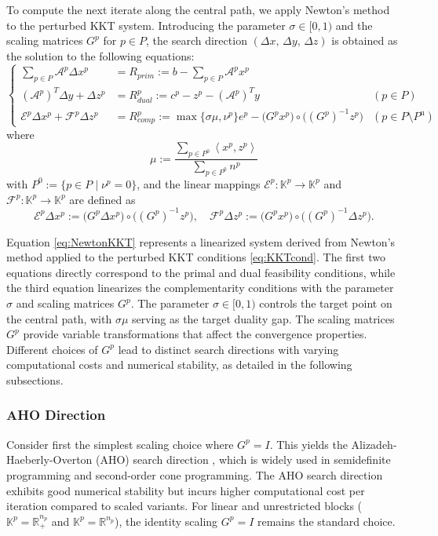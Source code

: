 To compute the next iterate along the central path, we apply Newton's method to the perturbed KKT system. 
Introducing the parameter $\sigma \in [0,1)$ and the scaling matrices $G^p$ for $p \in P$, the search direction $(\Delta x,\, \Delta y,\, \Delta z)$ is obtained as the solution to the following equations:
\begin{equation}
    \renewcommand{\arraystretch}{2.5}
    \left\{
    \begin{array}{rll}
         \sum_{p \in P} \mathcal{A}^p \Delta x^p & = R_{prim} := b - \sum_{p \in P} \mathcal{A}^p x^p &  \\
         (\mathcal{A}^p)^T \Delta y + \Delta z^p & = R_{dual}^p := c^p - z^p - (\mathcal{A}^p)^T y & (p \in P) \\
         \mathcal{E}^p \Delta x^p + \mathcal{F}^p \Delta z^p & = R_{comp}^p := \max\{\sigma \mu, \nu^p\} e^p - \big(G^p x^p\big) \circ \big((G^p)^{-1} z^p\big) & (p \in P \setminus P^{\text{u}})
    \end{array}
    \right.
    \label{eq:NewtonKKT}
\end{equation}
where 
\begin{equation}
  \mu := \frac{\sum_{p \in P^0} \left\langle x^p, z^p \right\rangle}
              {\sum_{p \in P^0} n^p}
  \label{eq:mu}
\end{equation}
with $P^0 := \{p\in P \mid \nu^p=0\}$, and the linear mappings $\mathcal{E}^p : \mathbb{K}^p \to \mathbb{K}^p$ and $\mathcal{F}^p : \mathbb{K}^p \to \mathbb{K}^p$ are defined as
\[
  \mathcal{E}^p \Delta x^p
    := \big(G^p \Delta x^p\big) \circ \big((G^p)^{-1} z^p\big),
  \quad
  \mathcal{F}^p \Delta z^p
    := \big(G^p x^p\big) \circ \big((G^p)^{-1} \Delta z^p\big).
\]

Equation \eqref{eq:NewtonKKT} represents a linearized system derived from Newton's method applied to the perturbed KKT conditions \eqref{eq:KKTcond}. 
The first two equations directly correspond to the primal and dual feasibility conditions, while the third equation linearizes the complementarity conditions with the parameter $\sigma$ and scaling matrices $G^p$.
The parameter $\sigma \in [0,1)$ controls the target point on the central path, with $\sigma \mu$ serving as the target duality gap.
The scaling matrices $G^p$ provide variable transformations that affect the convergence properties. 
Different choices of $G^p$ lead to distinct search directions with varying computational costs and numerical stability, as detailed in the following subsections.


\subsubsection{AHO Direction}
Consider first the simplest scaling choice where $G^p = I$. 
This yields the Alizadeh-Haeberly-Overton (AHO) search direction \cite{Alizadeh1998}, which is widely used in semidefinite programming and second-order cone programming. 
The AHO search direction exhibits good numerical stability but incurs higher computational cost per iteration compared to scaled variants. 
For linear and unrestricted blocks ($\mathbb{K}^p = \mathbb{R}^{n_p}_+$ and $\mathbb{K}^p = \mathbb{R}^{n_p}$), the identity scaling $G^p = I$ remains the standard choice.


